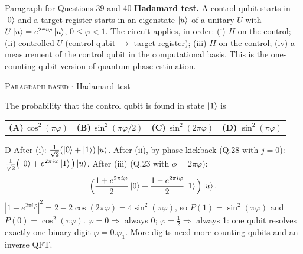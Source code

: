 \documentclass[11pt,a4paper]{article}
\newcommand{\optlabel}[1]{\textbf{(#1)}}
\newcommand{\correctlabel}[1]{\textcolor{okgreen}{\textbf{(#1)}\,\ding{51}}}
\newenvironment{qitem}[1]{\begin{list}{}{\setlength{\leftmargin}{3.3em}\setlength{\labelwidth}{3.1em}%
  \setlength{\labelsep}{0.2em}\setlength{\topsep}{3pt}\setlength{\parsep}{3pt}}\item[\textbf{Q.#1}\hfill]}{\end{list}}
\newcommand{\qsep}{\par\vspace{2pt}{\color{black!15}\hrule}\vspace{4pt}}
\newcommand{\qmeta}[2]{{\footnotesize\color{black!60}\textsc{#1} \;$\cdot$\; #2}\par}
\begin{document}
\begin{passagebox}{Paragraph for Questions 39 and 40}
\textbf{Hadamard test.} A control qubit starts in $\ket{0}$ and a target register starts in an eigenstate $\ket{u}$
of a unitary $U$ with $U\ket{u} = e^{2\pi i\varphi}\ket{u}$, $0 \le \varphi < 1$. The circuit applies, in order:
(i) $H$ on the control; (ii) controlled-$U$ (control qubit $\to$ target register); (iii) $H$ on the control;
(iv) a measurement of the control qubit in the computational basis. This is the one-counting-qubit version of quantum
phase estimation.
\end{passagebox}
\begin{qitem}{39}
\qmeta{Paragraph based}{Hadamard test}
The probability that the control qubit is found in state $\ket1$ is
\par\smallskip\noindent\begin{tabularx}{\linewidth}{@{}*{4}{L}@{}}
\optlabel{A}\,$\cos^2(\pi\varphi)$ & \optlabel{B}\,$\sin^2(\pi\varphi/2)$ & \optlabel{C}\,$\sin^2(2\pi\varphi)$ & \correctlabel{D}\,$\sin^2(\pi\varphi)$
\end{tabularx}
\end{qitem}
\begin{solbox}{D}
After (i): $\frac{1}{\sqrt2}(\ket0 + \ket1)\ket u$. After (ii), by phase kickback (Q.28 with $j = 0$):
$\frac{1}{\sqrt2}\big(\ket0 + e^{2\pi i\varphi}\ket1\big)\ket u$. After (iii) (Q.23 with $\phi = 2\pi\varphi$):
\[ \Big(\frac{1 + e^{2\pi i\varphi}}{2}\ket0 + \frac{1 - e^{2\pi i\varphi}}{2}\ket1\Big)\ket u . \]
$|1 - e^{2\pi i\varphi}|^2 = 2 - 2\cos(2\pi\varphi) = 4\sin^2(\pi\varphi)$, so $P(1) = \sin^2(\pi\varphi)$ and $P(0) = \cos^2(\pi\varphi)$.
$\varphi = 0 \Rightarrow$ always 0; $\varphi = \frac12 \Rightarrow$ always 1: one qubit resolves exactly one binary digit
$\varphi = 0.\varphi_1$. More digits need more counting qubits and an inverse QFT.
\end{solbox}
\qsep
\end{document}
